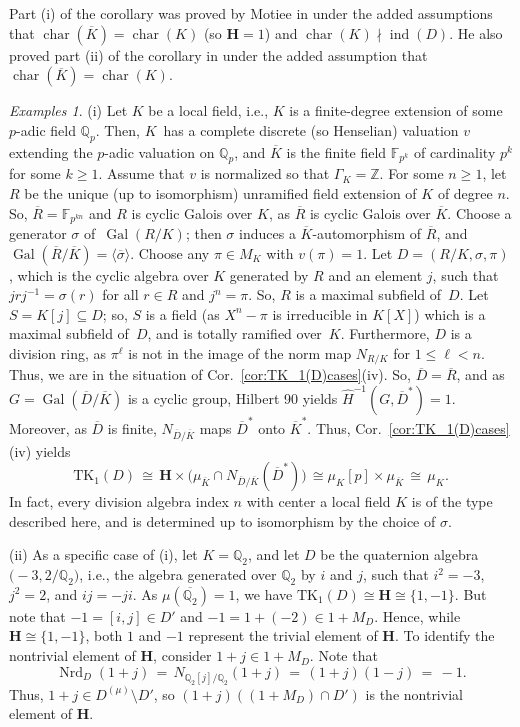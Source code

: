 \documentclass[11pt]{article}
\numberwithin{equation}{section}
\theoremstyle{plain}
\theoremstyle{remark}
\newtheorem{examples}[theorem]{Examples}
\newcommand{\opn}{\operatorname}
\newcommand{\TK}{\opn{TK_1}}
\newcommand{\Dmu}{D^{(\mu)}}
\newcommand{\Nrd}{\opn{Nrd}}
\newcommand{\zz}{\mathbb Z}
\newcommand{\qq}{\mathbb Q}
\newcommand{\ff}{\mathbb F}
\newcommand{\charr}{\opn{char}}
\newcommand{\ov}{\overline}
\newcommand{\bH}{\mathbf{H}}
\begin{document}
Part (i) of the corollary was proved by Motiee in \cite[Th.~10(1)]{motiee-2013}
under the added assumptions that $\charr(\ov K) = \charr(K)$ (so $\bH = 1$) and 
$\charr(K) \nmid \opn{ind}(D)$.  He also proved part (ii) of the corollary in \cite[Th.~10(2)]{motiee-2013}
under the added assumption that $\charr(\ov K) = \charr(K)$.

\medskip

\begin{examples}{\phantom{.}}

\label{ex:p-adic}
{}\!\!\!(i)
Let $K$ be a local field, i.e., $K$ is a finite-degree extension of some $p$-adic field 
$\qq_p$.  Then, $K$~has a complete discrete  (so Henselian) valuation  $v$ extending the
$p$-adic valuation on $\qq_p$, and $\ov K$ is the finite field  $\ff_{p^k}$ of cardinality $p^k$
for some $k\ge 1$.  Assume that $v$ is normalized so that $\Gamma_K = \zz$.  For some $n \ge 1$,
let $R$ be the unique (up to isomorphism) unramified field extension of $K$ of degree $n$.  So, 
$\ov R = \ff_{p^{kn}}$ and $R$ is cyclic Galois over $K$, as $\ov R$ is cyclic Galois over $\ov K$.
Choose a generator $\sigma$ of~$\opn{Gal}(R/K)$;  then $\sigma$ induces a $\ov K$-automorphism of 
$\ov R$, and $\opn{Gal}(\ov R/\ov K) = \langle \ov \sigma\rangle$. Choose any $\pi \in M_K$ with 
$v(\pi) = 1$.  Let $D = (R/K, \sigma, \pi)$, which is the cyclic algebra over $K$ generated by $R$ and 
an element $j$, such that $jrj^{-1} = \sigma(r)$ for all $r\in R$ and $j^n = \pi$.  So, $R$ is a maximal
subfield of~$D$.  Let $S = K[j] \subseteq D$; so, $S$ is a field (as $X^n - \pi$ is irreducible in $K[X]$)
which is a maximal subfield of~$D$, and is totally ramified over~$K$.  Furthermore, $D$ is a division 
ring, as $\pi^\ell$ is not in the image of the norm map $N_{R/K}$ for $1 \le \ell < n$.  Thus, we are in 
the situation of Cor.~\ref{cor:TK_1(D)cases}(iv).  So, $\ov D = \ov R$, and as $G = \opn{Gal}(\ov D/\ov K)$
is a cyclic group, Hilbert 90 yields $\widehat H^{-1}(G, \ov D^*) = 1$.  Moreover,  as $\ov D$ is finite, 
$N_{\ov D/\ov K}$ maps $\ov D^*$ onto $\ov K^*$.  Thus, Cor.~\ref{cor:TK_1(D)cases}(iv) yields
$$
\TK(D) \, \cong\, \bH \times \big(\mu_{\ov K} \cap  N_{\ov D/\ov K}(\ov D^*)\big) \,
\cong \mu_K[p] \times \mu_ {\ov K} \, \cong \,\mu_K.
$$
In fact, every division algebra index $n$ with center a local field $K$ is of the type described here,
and is determined up to isomorphism by the choice of $\sigma$.  

{}\!\!\!(ii) 
As a specific case of (i), let $K = \qq_2$, and let $D$ be the quaternion algebra 
$\big (-3, 2\big/ \qq_2 \big)$, i.e., the algebra generated over $\qq_2$ by $i$ and $j$, 
such that $i^2 = -3$, $j^2 = 2$, and $ij = -ji$.   As $\mu(\ov{\qq_2}) = 1$, we have 
$\TK(D) \cong \bH \cong \{1, -1\}$.  But note that $-1 = [i,j] \in D'$ and $-1 = 1 + (-2) \in 1+M_D$.  Hence, while 
$\bH \cong \{1,-1\}$, both $1$ and $-1$ represent the trivial element  of $\bH$.
 To identify the nontrivial element 
of $\bH$, consider $1+j\in 1+M_D$.  Note that 
$$
\Nrd_D(1+j) \,=\, N_{\qq_2[j]/\qq_2}(1+j) \,=\, (1 + j)(1-j) \,=\, -1.
$$
Thus, $1+j \in \Dmu \setminus D'$, so $(1+j)((1+M_D)\cap D')$ is the nontrivial element of $\bH$.
\end{examples}
\end{document}
